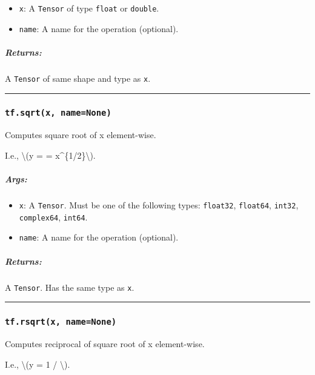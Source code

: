 \begin{itemize}
\tightlist
\item
  \texttt{x}: A \texttt{Tensor} of type \texttt{float} or
  \texttt{double}.
\item
  \texttt{name}: A name for the operation (optional).
\end{itemize}

\subparagraph{Returns: }\label{returns-11}

A \texttt{Tensor} of same shape and type as \texttt{x}.

\begin{center}\rule{0.5\linewidth}{\linethickness}\end{center}

\subsubsection{\texorpdfstring{\texttt{tf.sqrt(x,\ name=None)}
}{tf.sqrt(x, name=None) }}\label{tf.sqrtx-namenone}

Computes square root of x element-wise.

I.e., \textbackslash{}(y =  = x\^{}\{1/2\}\textbackslash{}).

\subparagraph{Args: }\label{args-12}

\begin{itemize}
\tightlist
\item
  \texttt{x}: A \texttt{Tensor}. Must be one of the following types:
  \texttt{float32}, \texttt{float64}, \texttt{int32},
  \texttt{complex64}, \texttt{int64}.
\item
  \texttt{name}: A name for the operation (optional).
\end{itemize}

\subparagraph{Returns: }\label{returns-12}

A \texttt{Tensor}. Has the same type as \texttt{x}.

\begin{center}\rule{0.5\linewidth}{\linethickness}\end{center}

\subsubsection{\texorpdfstring{\texttt{tf.rsqrt(x,\ name=None)}
}{tf.rsqrt(x, name=None) }}\label{tf.rsqrtx-namenone}

Computes reciprocal of square root of x element-wise.

I.e., \textbackslash{}(y = 1 / \textbackslash{}).

